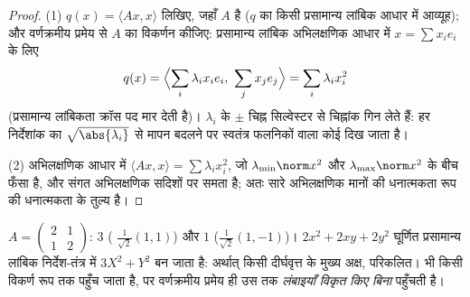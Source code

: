 \begin{proof}
(1) $q(x) = \langle A x, x\rangle$ लिखिए, जहाँ $A$  है ($q$ का किसी प्रसामान्य लांबिक आधार में
आव्यूह); और वर्णक्रमीय प्रमेय से $A$ का विकर्णन कीजिए: प्रसामान्य लांबिक
अभिलक्षणिक आधार में $x = \sum x_ie_i$ के लिए
\[
q(x) = \Bigl\langle \sum_i \lambda_ix_ie_i,\ \sum_j
x_je_j\Bigr\rangle = \sum_i \lambda_i x_i^2
\]
(प्रसामान्य लांबिकता क्रॉस पद मार देती है)। $\lambda_i$ के $\pm$ चिह्न सिल्वेस्टर
से चिह्नांक गिन लेते हैं: हर निर्देशांक का $\sqrt{\abs{\lambda_i}}$ से मापन बदलने पर स्वतंत्र
फलनिकों वाला कोई  दिख जाता है।

(2) अभिलक्षणिक आधार में $\langle Ax, x\rangle = \sum \lambda_i
x_i^2$, जो $\lambda_{\min}\norm x^2$ और $\lambda_{\max}\norm x^2$ के बीच फँसा है, और संगत
अभिलक्षणिक सदिशों पर समता है; अतः सारे अभिलक्षणिक मानों की धनात्मकता रूप
की धनात्मकता के तुल्य है।
\end{proof}

\begin{example}\label{ex:b2:quadratic:spectralexample}
$A = \begin{pmatrix} 2 & 1\\ 1 & 2 \end{pmatrix}$:  $3$ ( $\frac{1}{\sqrt2}(1,1)$) और $1$ ($\frac{1}{\sqrt2}(1,-1)$)। 
$2x^2 + 2xy + 2y^2$ घूर्णित प्रसामान्य लांबिक निर्देश-तंत्र में $3X^2 + Y^2$ बन जाता है: अर्थात्
किसी दीर्घवृत्त के मुख्य अक्ष, परिकलित।  भी किसी विकर्ण रूप तक
पहुँच जाता है, पर वर्णक्रमीय प्रमेय ही उस तक \emph{लंबाइयाँ विकृत किए
बिना} पहुँचती है।
\end{example}

